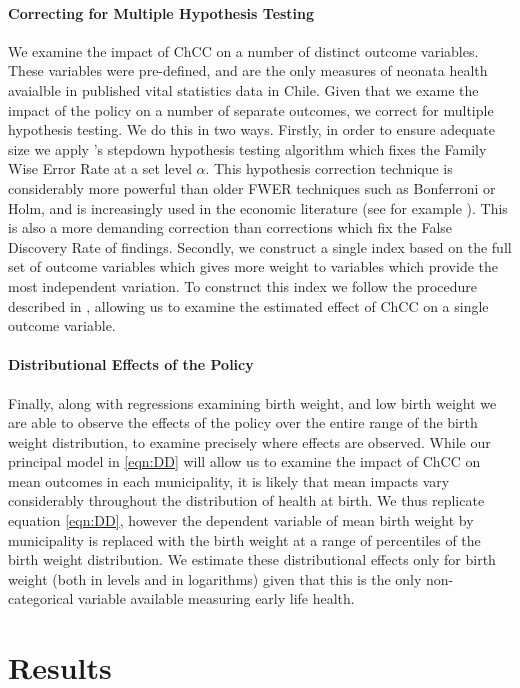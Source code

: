 \documentclass[12pt]{article}
\begin{document}
\begin{spacing}{1.4}
\paragraph{Correcting for Multiple Hypothesis Testing}
We examine the impact of ChCC on a number of distinct outcome
variables.  These variables were pre-defined, and are the only
measures of neonata health avaialble in published vital statistics
data in Chile.  Given that we exame the impact of the policy on a
number of separate outcomes, we correct for multiple hypothesis
testing.  We do this in two ways.  Firstly, in order to ensure
adequate size we apply \citet{RomanoWolf2005}'s stepdown hypothesis
testing algorithm which fixes the Family Wise Error Rate at a set
level $\alpha$.  This hypothesis correction technique is considerably
more powerful than older FWER techniques such as Bonferroni or Holm,
and is increasingly used in the economic literature (see for example
\citet{Gertler2014}).  This is also a more demanding correction than
corrections which fix the False Discovery Rate of findings.
Secondly, we construct a single index based on the full set of
outcome variables which gives more weight to variables which
provide the most independent variation.  To construct this index
we follow the procedure described in \citet{Anderson2008}, allowing
us to examine the estimated effect of ChCC on a single outcome
variable.

\paragraph{Distributional Effects of the Policy}
Finally, along with regressions examining birth weight, and low
birth weight we are able to observe the effects of the policy over
the entire range of the birth weight distribution, to examine
precisely where effects are observed.  While our principal model in
\ref{eqn:DD} will allow us to examine the impact of ChCC on mean
outcomes in each municipality, it is likely that mean impacts vary
considerably throughout the distribution of health at birth.
We thus replicate equation \ref{eqn:DD}, however the dependent
variable of mean birth weight by municipality is replaced with
the birth weight at a range of percentiles of the birth weight
distribution.  We estimate these distributional effects only
for birth weight (both in levels and in logarithms) given that
this is the only non-categorical variable available measuring
early life health.


\section{Results}

\end{spacing}
\end{document}
